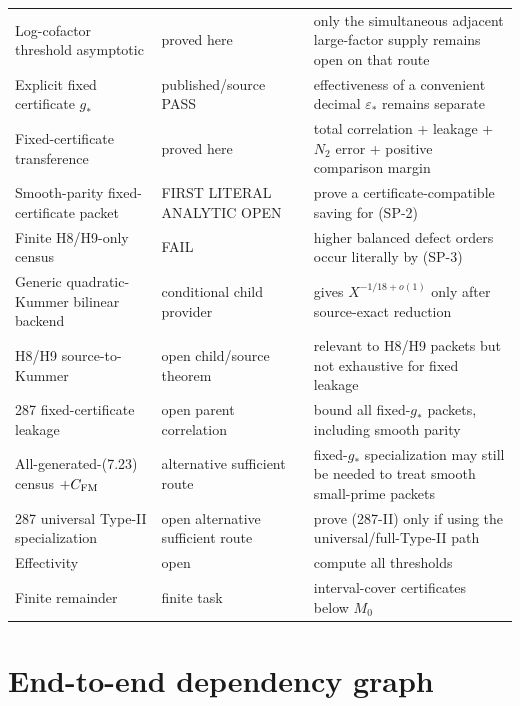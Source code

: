 \documentclass[11pt]{article}
\theoremstyle{definition}
\theoremstyle{remark}
\newcommand{\1}{\mathbf 1}
\begin{document}
\begin{longtable}{p{}p{}p{}}
Log-cofactor threshold asymptotic & proved here & only the simultaneous adjacent large-factor supply remains open on that route\\
Explicit fixed certificate $g_*$ & published/source PASS & effectiveness of a convenient decimal $\varepsilon_*$ remains separate\\
Fixed-certificate transference & proved here & total correlation + leakage + $N_2$ error + positive comparison margin\\
Smooth-parity fixed-certificate packet & FIRST LITERAL ANALYTIC OPEN & prove a certificate-compatible saving for (SP-2)\\
Finite H8/H9-only census & FAIL & higher balanced defect orders occur literally by (SP-3)\\
Generic quadratic-Kummer bilinear backend & conditional child provider & gives $X^{-1/18+o(1)}$ only after source-exact reduction\\
H8/H9 source-to-Kummer & open child/source theorem & relevant to H8/H9 packets but not exhaustive for fixed leakage\\
287 fixed-certificate leakage & open parent correlation & bound all fixed-$g_*$ packets, including smooth parity\\
All-generated-(7.23) census $+C_{\rm FM}$ & alternative sufficient route & fixed-$g_*$ specialization may still be needed to treat smooth small-prime packets\\
287 universal Type-II specialization & open alternative sufficient route & prove (287-II) only if using the universal/full-Type-II path\\
Effectivity & open & compute all thresholds\\
Finite remainder & finite task & interval-cover certificates below $M_0$\\
\bottomrule
\end{longtable}

\section{End-to-end dependency graph}
\end{document}
